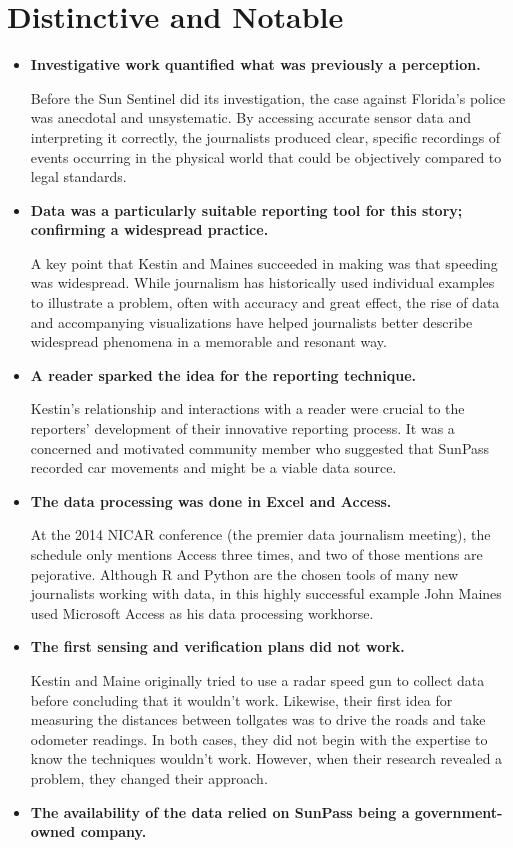 \section{Distinctive and Notable}
\begin{itemize}
\item \textbf{Investigative work quantified what was previously a perception.}

Before the Sun Sentinel did its investigation, the case against Florida's
police was anecdotal and unsystematic. By accessing accurate sensor
data and interpreting it correctly, the journalists produced clear, specific
recordings of events occurring in the physical world that could
be objectively compared to legal standards.
\item \textbf{Data was a particularly suitable reporting tool for this story;
confirming a widespread practice.}

A key point that Kestin and Maines succeeded in making was that
speeding was widespread. While journalism has historically used
individual examples to illustrate a problem, often with accuracy and
great effect, the rise of data and accompanying visualizations have
helped journalists better describe widespread phenomena in a memorable
and resonant way.
\item \textbf{A reader sparked the idea for the reporting technique.}

Kestin's relationship and interactions with a reader were crucial to the
reporters' development of their innovative reporting process. It was
a concerned and motivated community member who suggested that
SunPass recorded car movements and might be a viable data source.
\item \textbf{The data processing was done in Excel and Access.}

At the 2014 NICAR conference (the premier data journalism meeting),
the schedule only mentions Access three times, and two of
those mentions are pejorative. Although R and Python are the chosen
tools of many new journalists working with data, in this highly
successful example John Maines used Microsoft Access as his data
processing workhorse.
\item \textbf{The first sensing and verification plans did not work.}

Kestin and Maine originally tried to use a radar speed gun to collect
data before concluding that it wouldn't work. Likewise, their first idea
for measuring the distances between tollgates was to drive the roads
and take odometer readings. In both cases, they did not begin with
the expertise to know the techniques wouldn't work. However, when
their research revealed a problem, they changed their approach.
\item \textbf{The availability of the data relied on SunPass being a
government-owned company.}


\end{itemize}
